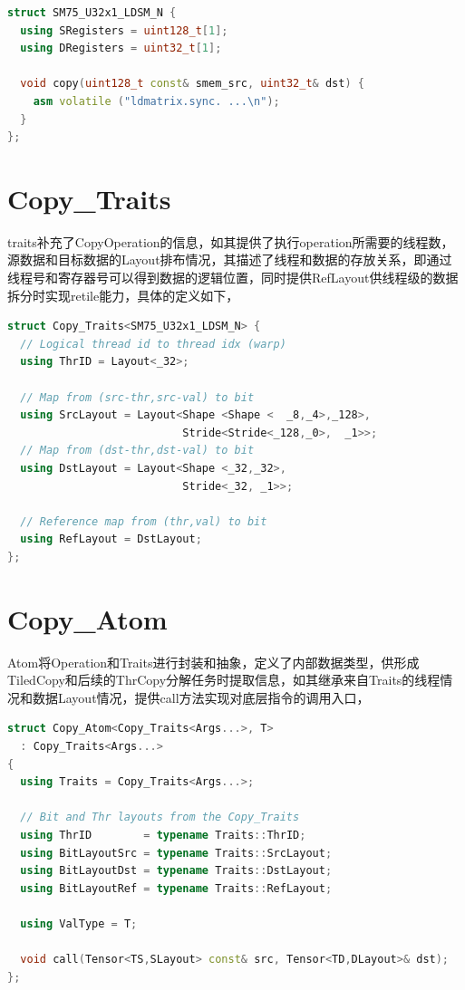 \begin{lstlisting}[language=C++]
struct SM75_U32x1_LDSM_N {
  using SRegisters = uint128_t[1];
  using DRegisters = uint32_t[1];

  void copy(uint128_t const& smem_src, uint32_t& dst) {
    asm volatile ("ldmatrix.sync. ...\n");
  }
};
\end{lstlisting}

\section{Copy\_Traits}

traits补充了CopyOperation的信息，如其提供了执行operation所需要的线程数，源数据和目标数据的Layout排布情况，其描述了线程和数据的存放关系，即通过线程号和寄存器号可以得到数据的逻辑位置，同时提供RefLayout供线程级的数据拆分时实现retile能力，具体的定义如下，

\begin{lstlisting}[language=C++]
struct Copy_Traits<SM75_U32x1_LDSM_N> {
  // Logical thread id to thread idx (warp)
  using ThrID = Layout<_32>;

  // Map from (src-thr,src-val) to bit
  using SrcLayout = Layout<Shape <Shape <  _8,_4>,_128>,
                           Stride<Stride<_128,_0>,  _1>>;
  // Map from (dst-thr,dst-val) to bit
  using DstLayout = Layout<Shape <_32,_32>,
                           Stride<_32, _1>>;

  // Reference map from (thr,val) to bit
  using RefLayout = DstLayout;
};
\end{lstlisting}

\section{Copy\_Atom}

Atom将Operation和Traits进行封装和抽象，定义了内部数据类型，供形成TiledCopy和后续的ThrCopy分解任务时提取信息，如其继承来自Traits的线程情况和数据Layout情况，提供call方法实现对底层指令的调用入口，

\begin{lstlisting}[language=C++]
struct Copy_Atom<Copy_Traits<Args...>, T>
  : Copy_Traits<Args...>
{
  using Traits = Copy_Traits<Args...>;

  // Bit and Thr layouts from the Copy_Traits
  using ThrID        = typename Traits::ThrID;
  using BitLayoutSrc = typename Traits::SrcLayout;
  using BitLayoutDst = typename Traits::DstLayout;
  using BitLayoutRef = typename Traits::RefLayout;

  using ValType = T;

  void call(Tensor<TS,SLayout> const& src, Tensor<TD,DLayout>& dst);
};
\end{lstlisting}


